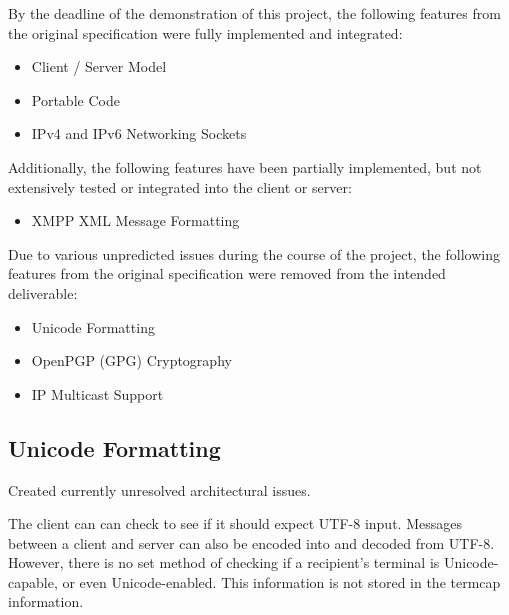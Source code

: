 
By the deadline of the demonstration of this project, the following
features from the original specification were fully implemented and
integrated:

\begin{itemize}

\item Client / Server Model

\item Portable Code

\item IPv4 and IPv6 Networking Sockets

\end{itemize}

Additionally, the following features have been partially implemented,
but not extensively tested or integrated into the client or server:

\begin{itemize}

\item XMPP XML Message Formatting

\end{itemize}


Due to various unpredicted issues during the course of the project, the
following features from the original specification were removed from the
intended deliverable:

\begin{itemize}

\item Unicode Formatting

\item OpenPGP (GPG) Cryptography

\item IP Multicast Support

\end{itemize}


\subsection{Unicode Formatting}

Created currently unresolved architectural issues. 


The client can can check to see if it should expect UTF-8 input. 
Messages between a client and server can also be encoded into and
decoded from UTF-8. However, there is no set method of checking if a
recipient's terminal is Unicode-capable, or even Unicode-enabled. This
information is not stored in the termcap information.

